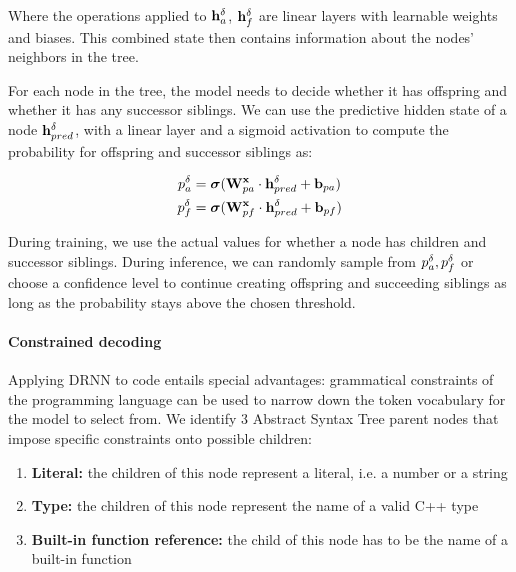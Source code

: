 Where the operations applied to $\mathbf{h}_a^\delta$, $\mathbf{h}_f^\delta$ are linear layers with learnable weights and biases. This combined state then contains information about the nodes' neighbors in the tree.



For each node in the tree, the model needs to decide whether it has offspring and whether it has any successor siblings. We can use the predictive hidden state of a node $\mathbf{h}^\delta_{pred}$, with a linear layer and a sigmoid activation to compute the probability for offspring and successor siblings as:

\begin{align}
    p_a^\delta &= \boldsymbol\sigma(\mathbf{W}^{\mathbf{x}}_{pa} \cdot \mathbf{h}_{pred}^\delta + \mathbf{b}_{pa}) \label{eq:prob_ancestral} \\
    p_f^\delta &= \boldsymbol\sigma(\mathbf{W}^{\mathbf{x}}_{pf} \cdot \mathbf{h}_{pred}^\delta + \mathbf{b}_{pf})\label{eq:prob_fraternal}
\end{align}

During training, we use the actual values for whether a node has children and successor siblings. 
During inference, we can randomly sample from $p_a^\delta,p_f^\delta$ or choose a confidence level to continue creating offspring and succeeding siblings as long as the probability stays above the chosen threshold. 

\paragraph{Constrained decoding}
Applying DRNN \cite{alvarezmelis2017tree} to code entails special advantages: grammatical constraints of the programming language can be used to narrow down the token vocabulary for the model to select from.
We identify 3 Abstract Syntax Tree parent nodes that impose specific constraints onto possible children:

\begin{enumerate}
    \item \textbf{Literal:} the children of this node represent a literal, i.e. a number or a string
    \item \textbf{Type:} the children of this node represent the name of a valid C++ type
    \item \textbf{Built-in function reference:} the child of this node has to be the name of a built-in function
\end{enumerate}

